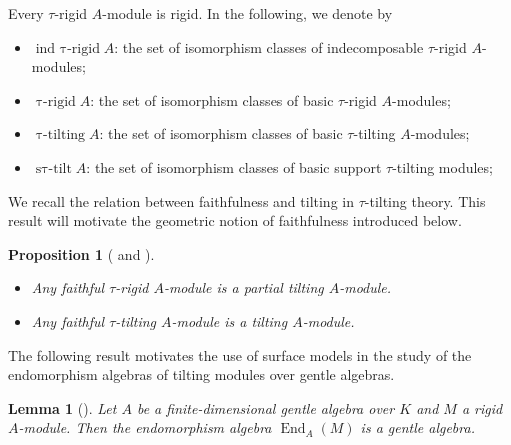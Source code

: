 \documentclass[a4paper,10pt]{amsart}
\theoremstyle{plain}          %
\newtheorem{proposition}[theorem]{Proposition}
\newtheorem{lemma}[theorem]{Lemma}
\theoremstyle{definition}
\newcommand{\opname}[1]{\operatorname{#1}}
\newcommand{\End}{\operatorname{End}\nolimits}
\begin{document}

Every $\tau$-rigid $A$-module is rigid. In the following, we denote by
\begin{itemize}
    \item $\opname{ind~\tau-rigid } A$: the set of isomorphism classes of indecomposable $\tau$-rigid $A$-modules;
    \item $\opname{\tau-rigid } A$: the set of isomorphism classes of basic $\tau$-rigid $A$-modules;
    \item $\opname{\tau-tilting}  A$: the set of isomorphism classes of basic $\tau$-tilting $A$-modules;
    \item $\opname{s\tau-tilt }  A$: the set of isomorphism classes of basic support $\tau$-tilting modules;
\end{itemize}
We recall the relation between faithfulness and tilting in $\tau$-tilting theory. This result will motivate the geometric notion of faithfulness introduced below.
\begin{proposition}[{\cite[Proposition 1.4]{AIR} and \cite[VIII.5.1]{ASS}}]\label{p:realtion between tau tilting module and tilting module}
    \begin{itemize}
        \item [(a)] Any faithful $\tau$-rigid $A$-module is a partial tilting $A$-module.
        \item [(b)] Any faithful $\tau$-tilting $A$-module is a tilting $A$-module.
    \end{itemize}
\end{proposition}
The following result motivates the use of surface models in the study of the endomorphism algebras of tilting modules over gentle algebras.
\begin{lemma}[{\cite[Theorem 1.1]{S}}]\label{l:endomorphism algebra is gentle}
	Let $A$ be a finite-dimensional gentle algebra over $K$ and ${M}$ a rigid $A$-module. Then the endomorphism algebra $\End_A (M)$ is a gentle algebra.
\end{lemma}
\end{document}
